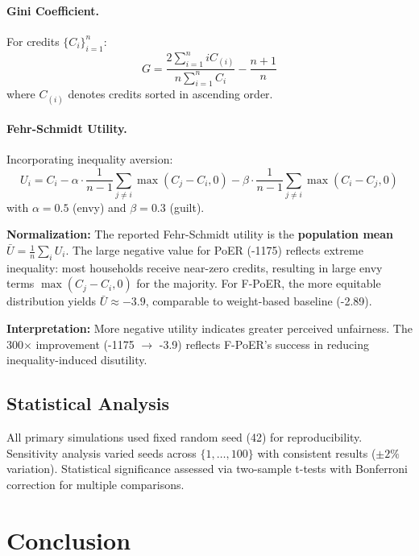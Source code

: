 \documentclass[12pt,a4paper]{article}
\begin{document}
\paragraph{Gini Coefficient.} For credits $\{C_i\}_{i=1}^n$:
\begin{equation}
G = \frac{2\sum_{i=1}^n i C_{(i)}}{n\sum_{i=1}^n C_i} - \frac{n+1}{n}
\end{equation}
where $C_{(i)}$ denotes credits sorted in ascending order.

\paragraph{Fehr-Schmidt Utility.} Incorporating inequality aversion\cite{fehr1999theory}:
\begin{equation}
U_i = C_i - \alpha \cdot \frac{1}{n-1}\sum_{j \neq i} \max(C_j - C_i, 0) - \beta \cdot \frac{1}{n-1}\sum_{j \neq i} \max(C_i - C_j, 0)
\end{equation}
with $\alpha=0.5$ (envy) and $\beta=0.3$ (guilt).

\textbf{Normalization:} The reported Fehr-Schmidt utility is the \textbf{population mean} $\bar{U} = \frac{1}{n}\sum_i U_i$. The large negative value for PoER (-1175) reflects extreme inequality: most households receive near-zero credits, resulting in large envy terms $\max(C_j - C_i, 0)$ for the majority. For F-PoER, the more equitable distribution yields $\bar{U} \approx -3.9$, comparable to weight-based baseline (-2.89).

\textbf{Interpretation:} More negative utility indicates greater perceived unfairness. The 300$\times$ improvement (-1175 $\rightarrow$ -3.9) reflects F-PoER's success in reducing inequality-induced disutility.

\subsection{Statistical Analysis}

All primary simulations used fixed random seed (42) for reproducibility. Sensitivity analysis varied seeds across $\{1, \ldots, 100\}$ with consistent results ($\pm 2\%$ variation). Statistical significance assessed via two-sample t-tests with Bonferroni correction for multiple comparisons.

\section{Conclusion}
\end{document}
